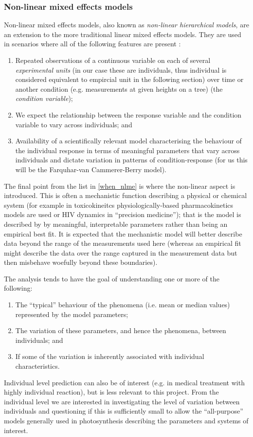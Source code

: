 \documentclass[11pt]{article} %
\begin{document}
\subsubsection{Non-linear mixed effects models}
Non-linear mixed effects models, also known as \emph{non-linear hierarchical models}, are an extension to the more traditional linear mixed effects models. They are used in scenarios where all of the following features are present \cite{DavidianNonlinearmodelsrepeated2003a}:
\begin{enumerate}  \label{when_nlme}
 \item Repeated observations of a continuous variable on each of several \emph{experimental units} (in our case these are individuals, thus individual is considered equivalent to empircial unit in the following section) over time or another condition (e.g. measurements at given heights on a tree) (the \emph{condition variable});
 \item We expect the relationship between the response variable and the condition variable to vary across individuals; and
 \item Availability of a scientifically relevant model characterising the behaviour of the individual response in terms of meaningful parameters that vary across individuals and dictate variation in patterns of condition-response (for us this will be the Farquhar-van Cammerer-Berry model).
\end{enumerate}
The final point from the list in \ref{when_nlme} is where the non-linear aspect is introduced. This is often a mechanistic function describing a physical or chemical system (for example in toxicokineitcs physiologically-based pharmacokinetics models are used or HIV dynamics in ``precision medicine''); that is the model is described by by meaningful, interpretable parameters rather than being an empirical best fit. It is expected that the mechanistic model will better describe data beyond the range of the measurements used here (whereas an empirical fit might describe the data over the range captured in the measurement data but then misbehave woefully beyond these boundaries).

The analysis tends to have the goal of understanding one or more of the following:
\begin{enumerate}
 \item The ``typical'' behaviour of the phenomena (i.e. mean or median values) represented by the model parameters;
 \item The variation of these parameters, and hence the phenomena, between individuals; and
 \item If some of the variation is inherently associated with individual characteristics.
\end{enumerate}
Individual level prediction can also be of interest (e.g. in medical treatment with highly individual reaction), but is less relevant to this project. From the individual level we are interested in investigating the level of variation between individuals and questioning if this is sufficiently small to allow the ``all-purpose'' models generally used in photosynthesis describing the parameters and systems of interest.
\end{document}

